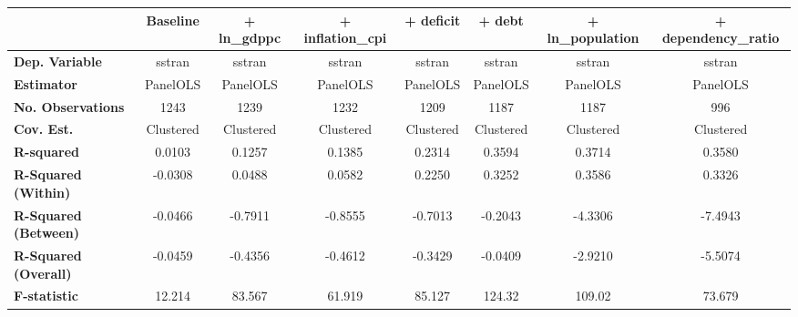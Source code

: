 \begin{center}
\begin{tabular}{lccccccc}
\toprule
                                   & \textbf{Baseline} & \textbf{+ ln\_gdppc} & \textbf{+ inflation\_cpi} & \textbf{+ deficit} & \textbf{+ debt} & \textbf{+ ln\_population} & \textbf{+ dependency\_ratio}  \\
\midrule
\textbf{Dep. Variable}             &       sstran      &        sstran        &           sstran          &       sstran       &      sstran     &           sstran          &            sstran             \\
\textbf{Estimator}                 &      PanelOLS     &       PanelOLS       &          PanelOLS         &      PanelOLS      &     PanelOLS    &          PanelOLS         &           PanelOLS            \\
\textbf{No. Observations}          &        1243       &         1239         &            1232           &        1209        &       1187      &            1187           &             996               \\
\textbf{Cov. Est.}                 &     Clustered     &      Clustered       &         Clustered         &     Clustered      &    Clustered    &         Clustered         &          Clustered            \\
\textbf{R-squared}                 &       0.0103      &        0.1257        &           0.1385          &       0.2314       &      0.3594     &           0.3714          &            0.3580             \\
\textbf{R-Squared (Within)}        &      -0.0308      &        0.0488        &           0.0582          &       0.2250       &      0.3252     &           0.3586          &            0.3326             \\
\textbf{R-Squared (Between)}       &      -0.0466      &       -0.7911        &          -0.8555          &      -0.7013       &     -0.2043     &          -4.3306          &           -7.4943             \\
\textbf{R-Squared (Overall)}       &      -0.0459      &       -0.4356        &          -0.4612          &      -0.3429       &     -0.0409     &          -2.9210          &           -5.5074             \\
\textbf{F-statistic}               &       12.214      &        83.567        &           61.919          &       85.127       &      124.32     &           109.02          &            73.679             \\

\end{tabular}
\end{center}

